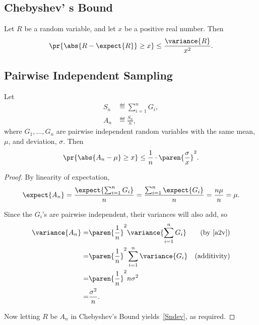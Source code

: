 \documentclass[handout]{mcs}
\begin{document}
{\subsection*{Chebyshev' s Bound}
Let $R$ be a random variable, and let $x$ be a positive real number.
Then
\[
\pr{\abs{R - \expect{R}} \geq x} \leq \frac{\variance{R}}{x^2}.
\]

\subsection*{Pairwise Independent Sampling}

\begin{theorem*}
Let
\begin{align*}
S_n & \eqdef \sum_{i=1}^n G_i,\\
A_n & \eqdef \frac{S_n}{n},
\end{align*}
where $G_1, \dots, G_n$ are pairwise independent random variables with the
same mean, $\mu$, and deviation, $\sigma$.  Then
\begin{equation}\label{Sndev}
\pr{\abs{A_n - \mu} \geq x} \leq 
\frac{1}{n}  \cdot \paren{\frac{\sigma}{x}}^2.
\end{equation}
\end{theorem*}

\begin{proof}
By linearity of expectation,
\[
\expect{A_n} = \frac{\expect{\sum_{i=1}^n G_i}}{n}
   = \frac{\sum_{i=1}^n \expect{G_i}}{n}
   = \frac{n\mu}{n} = \mu.
\]

Since the $G_i$'s are pairwise independent, their variances will also add,
so
\begin{align*}
\variance{A_n}  = & \paren{\frac{1}{n}}^2 \variance{\sum_{i=1}^n G_i}
                        & \text{(by~\eqref{a2v})}\\
 = & \paren{\frac{1}{n}}^2 \sum_{i=1}^n \variance{G_i}
                        & \text{(additivity)}\\
 = & \paren{\frac{1}{n}}^2 n\sigma^2\\
 = & \frac{\sigma^2}{n}.
\end{align*}

Now letting $R$ be $A_n$ in Chebyshev's Bound
yields~\eqref{Sndev}, as required.

\end{proof}
}
\end{document}
